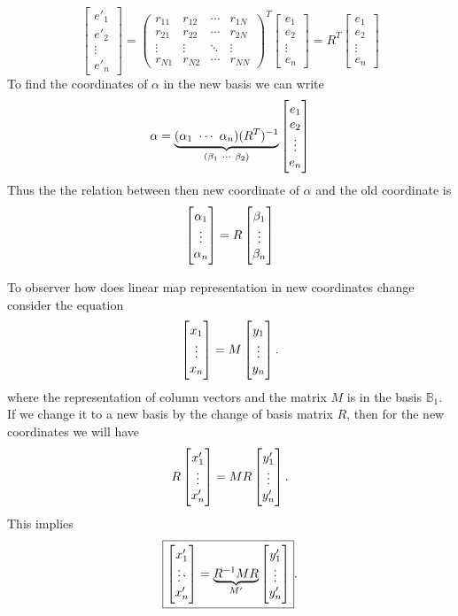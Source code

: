 \[ 
\begin{bmatrix}
	e'_1 \\
	e'_2 \\
	\vdots\\
	e'_n
\end{bmatrix}
= 
\begin{pmatrix}
	r_{11} & r_{12} & \cdots & r_{1N} \\
	r_{21} & r_{22} & \cdots & r_{2N} \\ 
	\vdots & \vdots & \ddots & \vdots \\
	r_{N1} & r_{N2} & \cdots & r_{NN}
\end{pmatrix}^T
\begin{bmatrix}
	e_1 \\
	e_2 \\
	\vdots \\
	e_n
\end{bmatrix} = 
R^T 
\begin{bmatrix}
	e_1 \\
	e_2 \\
	\vdots \\
	e_n
\end{bmatrix}
 \]
To find the coordinates of $ \alpha $ in the new basis we can write
\[ \alpha = \underbrace{(\alpha_1\ \cdots\ \alpha_n) \inv{(R^T)} }_{(\beta_1\ \cdots\ \beta_2)}
\begin{bmatrix}
	e_1 \\
	e_2 \\
	\vdots \\
	e_n
\end{bmatrix}
 \]
Thus the the relation between then new coordinate of $ \alpha $ and the old coordinate is 
\[ \begin{bmatrix} \alpha_1 \\ \vdots \\ \alpha_n \end{bmatrix} = R \begin{bmatrix} \beta_1 \\ \vdots \\ \beta_n \end{bmatrix} \]

To observer how does linear map representation in new coordinates change consider the equation 
\[ \begin{bmatrix} x_1 \\ \vdots \\ x_n \end{bmatrix} = M \begin{bmatrix} y_1 \\ \vdots \\ y_n \end{bmatrix}. \]
where the representation of column vectors and the matrix $ M $ is in the basis $ \mathbb{B}_1 $. If we change it to a new basis by the change of basis matrix $ R $, then for the new coordinates we will have
\[ R\begin{bmatrix} x_1' \\ \vdots \\ x_n' \end{bmatrix} = M R \begin{bmatrix} y_1' \\ \vdots \\ y_n' \end{bmatrix}. \] 
This implies
\[ \boxed{\begin{bmatrix} x_1' \\ \vdots` \\ x_n' \end{bmatrix} = \underbrace{R^{-1}M R }_{M'}\begin{bmatrix} y_1' \\ \vdots \\ y_n' \end{bmatrix}}. \]

